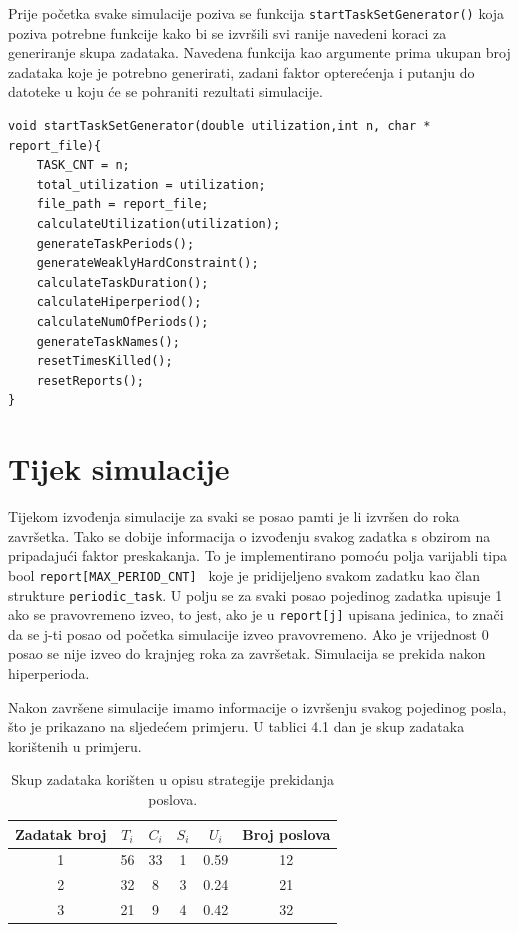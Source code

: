 \documentclass[../zavrsni.tex]{subfiles}
\begin{document}
Prije početka svake simulacije poziva se funkcija \texttt{startTaskSetGenerator()} koja poziva potrebne funkcije kako bi se izvršili 
svi ranije navedeni koraci za generiranje skupa zadataka. Navedena funkcija kao argumente prima ukupan broj zadataka koje je potrebno generirati, zadani 
faktor opterećenja i putanju do datoteke u koju će se pohraniti rezultati simulacije.
\begin{lstlisting}[style=CStyle,caption={Funckija \texttt{startTaskSetGenerator()}},captionpos=b]
void startTaskSetGenerator(double utilization,int n, char * report_file){
    TASK_CNT = n; 
    total_utilization = utilization; 
    file_path = report_file;
    calculateUtilization(utilization);
    generateTaskPeriods();
    generateWeaklyHardConstraint();
    calculateTaskDuration();
    calculateHiperperiod();
    calculateNumOfPeriods();
    generateTaskNames();
    resetTimesKilled();
    resetReports();
}
\end{lstlisting}
\section{Tijek simulacije}

Tijekom izvođenja simulacije za svaki se posao pamti je li izvršen do roka završetka.  
Tako se dobije informacija o izvođenju svakog zadatka s obzirom na pripadajući faktor preskakanja. To je implementirano 
pomoću polja varijabli tipa bool \texttt{report[MAX\_PERIOD\_CNT] } koje je pridijeljeno svakom zadatku kao član strukture \texttt{periodic\_task}.
U polju se za svaki posao pojedinog zadatka upisuje 1 ako se pravovremeno izveo, to jest, ako je u \texttt{report[j]} upisana jedinica, to znači da se 
j-ti posao od početka simulacije izveo pravovremeno. Ako je vrijednost 0 posao se nije izveo do krajnjeg roka za završetak.
Simulacija se prekida nakon hiperperioda.

Nakon završene simulacije imamo informacije o izvršenju svakog pojedinog posla, što je prikazano na sljedećem primjeru. U tablici 4.1 dan je 
skup zadataka korištenih u primjeru.

\begin{table}[h!]
    \begin{center}
      \begin{tabular}{||c || c c c c c||} 
       \hline
       Zadatak broj & $T_i$ & $C_i$ & $S_i$ & $U_i$ & Broj poslova \\ [0.5ex] 
       \hline\hline
       1 & 56 & 33 & 1 & 0.59 & 12 \\ 
       \hline
       2 & 32 & 8 & 3 & 0.24 & 21 \\
       \hline
       3 & 21 & 9 & 4 & 0.42 & 32 \\
       \hline
      \end{tabular}
    \end{center}
    \caption{\label{tab:table-name}Skup zadataka korišten u opisu strategije prekidanja poslova.}
    \end{table}
\end{document}
